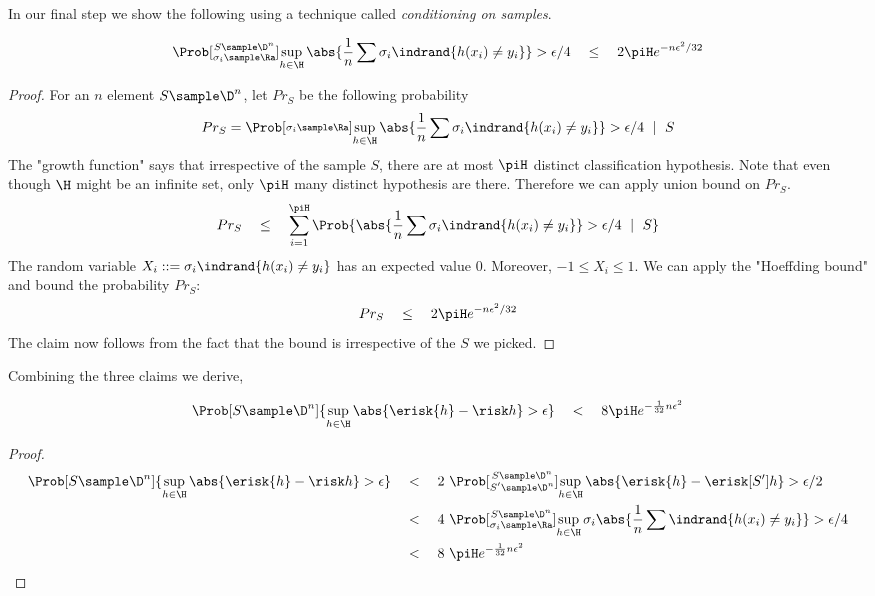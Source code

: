%
\noindent In our final step we show the following using a technique called \emph{conditioning on samples}.
\begin{claim}
\begin{align*}
 \Prob [\substack{S \sample \D^n \\ \sigma_i \sample \Ra}] {\sup_{h \in \H} \abs{\frac{1}{n} \sum  \sigma_i \indrand{h(x_i) \neq y_i}} > \epsilon/4} \quad \leq \quad 2\piH e^{-n\epsilon^2/32}
\end{align*}
\end{claim}
\begin{proof}
For an $n$ element $S \sample \D^n$, let $Pr_S$ be the following probability 
\[ Pr_S = \Prob [\substack{\sigma_i \sample \Ra}] {\sup_{h \in \H} \abs{\frac{1}{n} \sum  \sigma_i \indrand{h(x_i) \neq y_i} } > \epsilon/4 \ \mid\ S }\]
%
The "growth function" says that irrespective of the sample $S$, there are at most $\piH$ distinct classification hypothesis. Note that even though $\H$ might be an infinite set, only $\piH$ many distinct hypothesis are there. Therefore we can apply union bound on $Pr_S$.
\[
Pr_S \quad \leq \quad \sum_{i =1}^{\piH} \Prob {\abs{  \frac{1}{n} \sum  \sigma_i \indrand{h(x_i) \neq y_i} } > \epsilon/4 \ \mid\ S }
\]
The random variable $X_i \defs \sigma_i \indrand{h(x_i) \neq y_i}$ has an expected value $0$. Moreover, $-1 \leq X_i \leq 1$. We can apply the "Hoeffding bound" and bound the probability $Pr_S$:
\[
Pr_S \quad \leq \quad 2\piH e^{-n\epsilon^2/32}
\]
The claim now follows from the fact that the bound is irrespective of the $S$ we picked.
\end{proof}

Combining the three claims we derive,
\begin{lemma}
\label{lem:vcucbound}
\[
\Prob [S \sample \D^n] {\sup_{h \in \H} \abs{\erisk{h} - \risk h} > \epsilon}\quad <\quad \cone \piH e^{-\ctwo n \epsilon^2}
\]
\end{lemma}
\begin{proof}
\begin{align*}
\Prob [S \sample \D^n] {\sup_{h \in \H} \abs{\erisk{h} - \risk h} > \epsilon}\quad & <\quad 2\	 \Prob [\substack{S \sample \D^n \\  S' \sample \D^n}] {\sup_{h \in \H} \abs{\erisk{h} - \erisk[S'] h} > \epsilon/2} \\
& < \quad 4\ \Prob [\substack{S \sample \D^n \\ \sigma_i \sample \Ra}] {\sup_{h \in \H} \sigma_i \abs{\frac{1}{n} \sum \indrand{h(x_i) \neq y_i} } > \epsilon/4} \\
& < \quad \cone\ \piH e^{-\ctwo n\epsilon^2}
\end{align*}
\end{proof}

